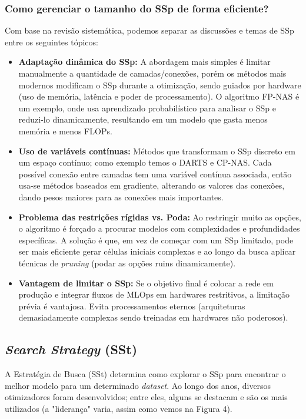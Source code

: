 \documentclass[a4paper,12pt]{article}
\begin{document}
\subsubsection{Como gerenciar o tamanho do SSp de forma eficiente?}

Com base na revisão sistemática, podemos separar as discussões e temas de SSp entre os seguintes tópicos:

\begin{itemize}
    \item \textbf{Adaptação dinâmica do SSp:} A abordagem mais simples é limitar manualmente a quantidade de camadas/conexões, porém os métodos mais modernos modificam o SSp durante a otimização, sendo guiados por hardware (uso de memória, latência e poder de processamento). O algoritmo FP-NAS é um exemplo, onde usa aprendizado probabilístico para analisar o SSp e reduzi-lo dinamicamente, resultando em um modelo que gasta menos memória e menos FLOPs.

    \item \textbf{Uso de variáveis contínuas:} Métodos que transformam o SSp discreto em um espaço contínuo; como exemplo temos o DARTS e CP-NAS. Cada possível conexão entre camadas tem uma variável contínua associada, então usa-se métodos baseados em gradiente, alterando os valores das conexões, dando pesos maiores para as conexões mais importantes.
    
    \item \textbf{Problema das restrições rígidas vs. Poda:} Ao restringir muito as opções, o algoritmo é forçado a procurar modelos com complexidades e profundidades específicas. A solução é que, em vez de começar com um SSp limitado, pode ser mais eficiente gerar células iniciais complexas e ao longo da busca aplicar técnicas de \textit{pruning} (podar as opções ruins dinamicamente).
    
    \item \textbf{Vantagem de limitar o SSp:} Se o objetivo final é colocar a rede em produção e integrar fluxos de MLOps em hardwares restritivos, a limitação prévia é vantajosa. Evita processamentos eternos (arquiteturas demasiadamente complexas sendo treinadas em hardwares não poderosos).
\end{itemize}

\subsection{\textit{Search Strategy} (SSt)}
A Estratégia de Busca (SSt) determina como explorar o SSp para encontrar o melhor modelo para um determinado \textit{dataset}. Ao longo dos anos, diversos otimizadores foram desenvolvidos; entre eles, alguns se destacam e são os mais utilizados (a "liderança" varia, assim como vemos na Figura 4).
\end{document}
